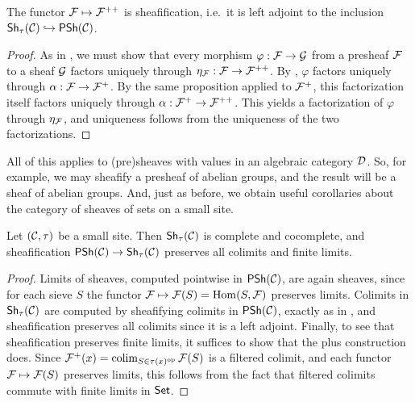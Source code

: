 \begin{theorem}\label{thm:chap:sheaves:sec:sites:sheafification}
    The functor $\cal{F} \mapsto \cal{F}^{++}$ is sheafification, i.e.\ it is left adjoint to the inclusion $\Sh_{\tau}(\catC) \hookrightarrow \PSh(\catC)$.
\end{theorem}
\begin{proof}
    As in , we must show that every morphism $\varphi : \cal{F} \to \cal{G}$ from a presheaf $\cal{F}$ to a sheaf $\cal{G}$ factors uniquely through $\eta_{\cal{F}} : \cal{F} \to \cal{F}^{++}$. By , $\varphi$ factors uniquely through $\alpha : \cal{F} \to \cal{F}^+$. By the same proposition applied to $\cal{F}^+$, this factorization itself factors uniquely through $\alpha : \cal{F}^+ \to \cal{F}^{++}$. This yields a factorization of $\varphi$ through $\eta_{\cal{F}}$, and uniqueness follows from the uniqueness of the two factorizations.
\end{proof}

All of this applies to (pre)sheaves with values in an algebraic category $\catD$. So, for example, we may sheafify a presheaf of abelian groups, and the result will be a sheaf of abelian groups. And, just as before, we obtain useful corollaries about the category of sheaves of sets on a small site.

\begin{theorem}\label{thm:chap:sheaves:sec:sites:category of sheaves is complete and cocomplete}
    Let $(\catC,\tau)$ be a small site. Then $\Sh_{\tau}(\catC)$ is complete and cocomplete, and sheafification $\PSh(\catC) \to \Sh_{\tau}(\catC)$ preserves all colimits and finite limits.
\end{theorem}
\begin{proof}
    Limits of sheaves, computed pointwise in $\PSh(\catC)$, are again sheaves, since for each sieve $S$ the functor $\cal{F} \mapsto \cal{F}(S) = \Hom(S,\cal{F})$ preserves limits. Colimits in $\Sh_{\tau}(\catC)$ are computed by sheafifying colimits in $\PSh(\catC)$, exactly as in , and sheafification preserves all colimits since it is a left adjoint. Finally, to see that sheafification preserves finite limits, it suffices to show that the plus construction does. Since $\cal{F}^+(x) = \colim_{S \in \tau(x)^\op} \cal{F}(S)$ is a filtered colimit, and each functor $\cal{F} \mapsto \cal{F}(S)$ preserves limits, this follows from the fact that filtered colimits commute with finite limits in $\Set$.
\end{proof}

